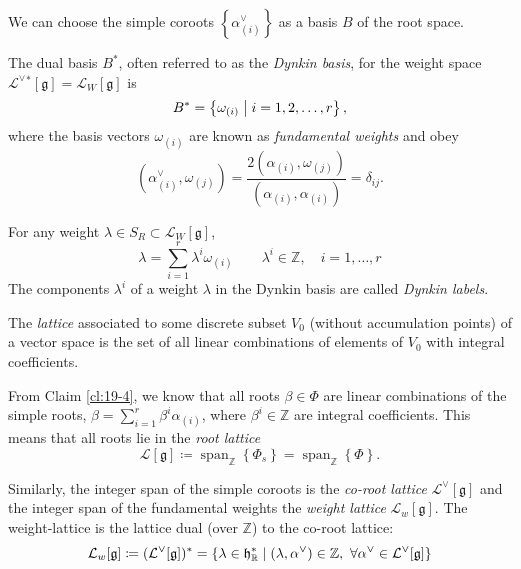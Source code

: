 We can choose the simple coroots $\left\{\alpha_{(i)}^{\vee}\right\}$ as a basis $B$ of the root space.
\begin{definition}
  The dual basis $B^*$, often referred to as the \emph{Dynkin basis}, for the weight space $\mathcal{L}^{\vee}{}^* [\mathfrak{g}] = \mathcal{L}_W[\mathfrak{g}]$ is
  \begin{equation}
    B^* = \left\{ \omega_{(i)} \suchthat i = 1, 2, \dots, r \right\},
  \end{equation}
  where the basis vectors $\omega_{(i)}$ are known as \emph{fundamental weights} and obey
  \begin{equation}
    \label{eq:24}
    (\alpha_{(i)}^\vee, \omega_{(j)}) = \frac{2 (\alpha_{(i)}, \omega_{(j)})}{(\alpha_{(i)}, \alpha_{(i)})} = \delta_{ij}.
  \end{equation}
\end{definition}
\begin{definition}
  For any weight $\lambda \in S_R \subset \mathcal{L}_W[\mathfrak{g}]$, 
  \begin{equation}
    \lambda = \sum_{i=1}^{r} \lambda^{i} \omega_{(i)} \qquad \lambda^{i} \in \mathbb{Z}, \quad i = 1, \dots, r
  \end{equation}
  The components $\lambda^{i}$ of a weight $\lambda$ in the Dynkin basis are called \emph{Dynkin labels}.
\end{definition}

\begin{leftbar}
  \begin{definition}[lattice]
    The \emph{lattice} associated to some discrete subset $V_0$ (without accumulation points) of a vector space is the set of all linear combinations of elements of $V_0$ with integral coefficients.
  \end{definition}
\end{leftbar}

From Claim \ref{cl:19-4}, we know that all roots $\beta \in \Phi$ are linear combinations of the simple roots, $\beta = \sum_{i=1}^{r} \beta^{i} \alpha_{(i)}$, where $\beta^{i} \in \mathbb{Z}$ are integral coefficients.
This means that all roots lie in the \emph{root lattice}
\begin{equation}
  \mathcal{L}[\mathfrak{g}] \coloneqq \operatorname{span}_{\mathbb{Z}}\left\{ \Phi_s \right\} = \operatorname{span}_{\mathbb{Z}}\left\{ \Phi \right\}.
\end{equation}

Similarly, the integer span of the simple coroots is the \emph{co-root lattice} $\mathcal{L}^\vee [\mathfrak{g}] $ and the integer span of the fundamental weights the \emph{weight lattice} $\mathcal{L}_w[\mathfrak{g}]$.
The weight-lattice is the lattice dual (over $\mathbb{Z}$) to the co-root lattice:
\begin{equation}
  \mathcal{L}_w[\mathfrak{g}] \coloneqq (\mathcal{L}^\vee[\mathfrak{g}])^* = \left\{ \lambda \in \mathfrak{h}^*_{\mathbb{R}} \suchthat (\lambda, \alpha^\vee) \in \mathbb{Z}, \ \forall \alpha^\vee \in \mathcal{L}^\vee[\mathfrak{g}] \right\}
\end{equation}

